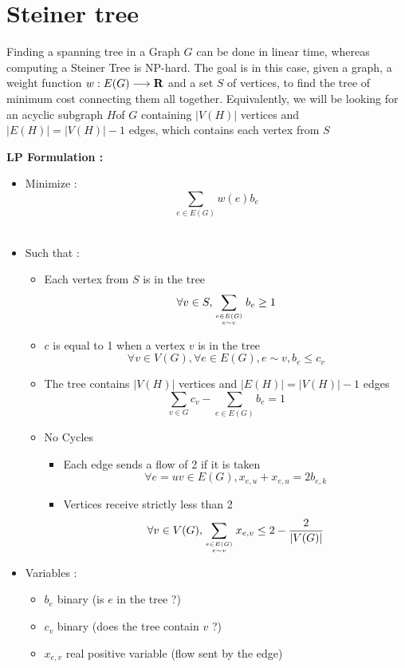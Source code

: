 \section{Steiner tree}
Finding  a spanning tree  in a Graph $G$ can be done in linear time, whereas computing a Steiner Tree is NP-hard. The goal is in this case, given a graph, a weight function $w:E(G) \longrightarrow \mathbf{R}$ and a set $S$ of vertices, to find the tree of minimum cost connecting them all together. Equivalently, we will be looking for an acyclic subgraph $H$of $G$ containing $|V(H)|$ vertices and $|E(H)|=|V(H)|-1$ edges, which contains each vertex from $S$

{\bf LP Formulation :}
\begin{itemize}
\item Minimize : $$\sum_{e\in E(G)}w(e) b_e$$\\
\item Such that :
  \begin{itemize}
  \item Each vertex from $S$ is in the tree
    $$\forall v \in S, \sum_{e\in E(G)\atop e\sim v}b_e \geq 1$$
  \item $c$ is equal to 1 when a vertex $v$ is in the tree
    $$\forall v \in V(G), \forall e\in E(G), e\sim v, b_e\leq c_v$$
  \item The tree contains $|V(H)|$ vertices and $|E(H)|=|V(H)|-1$ edges
    $$\sum_{v\in G}c_v - \sum_{e\in E(G)}b_e = 1$$
  \item No Cycles
    \begin{itemize}
    \item Each edge sends a flow of 2 if it is taken
      $$\forall e=uv\in E(G), x_{e,u} + x_{e,u} = 2b_{e,k}$$
    \item Vertices receive strictly less than 2
      $$\forall v\in V(G), \sum_{e\in E(G)\atop e\sim v}x_{e,v}\leq 2-\frac 2 {|V(G)|}$$
    \end{itemize}

  \end{itemize}
\item Variables :
  \begin{itemize}
  \item $b_e$  binary (is $e$ in the tree ?)
  \item $c_v$ binary (does the tree contain $v$ ?)
  \item $x_{e,v}$ real positive variable (flow sent by the edge)
  \end{itemize}
\end{itemize}


